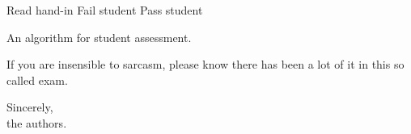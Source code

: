 \documentclass[a4paper,addpoints]{miunexam}
\begin{document}
\begin{questions}

	\begin{algorithm}[p]
		\begin{algorithmic}
			\Statex

				\State Read hand-in
					Fail student
				\Else
					Pass student
				\EndIf
			\EndWhile
		\end{algorithmic}
		\caption{An algorithm for student assessment.}
		\label{alg:FailStudents}
	\end{algorithm}

\end{questions}

\vspace{2cm}
If you are insensible to sarcasm, please know there has been a lot of it in
this so called exam.
\vspace{0.5cm}
\begin{flushright}
	\parbox{0.5\textwidth}{
	Sincerely,\\
	the authors.
	}
\end{flushright}
\end{document}
